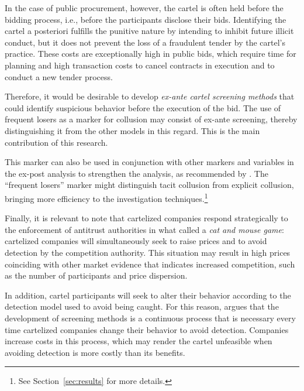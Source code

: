 In the case of public procurement, however, the cartel is often held before the bidding process, i.e., before the participants disclose their bids. Identifying the cartel a posteriori fulfills the punitive nature by intending to inhibit future illicit conduct, but it does not prevent the loss of a fraudulent tender by the cartel's practice. These costs are exceptionally high in public bids, which require time for planning and high transaction costs to cancel contracts in execution and to conduct a new tender process.

Therefore, it would be desirable to develop \textit{ex-ante cartel screening methods} that could identify suspicious behavior before the execution of the bid. The use of frequent losers as a marker for collusion may consist of ex-ante screening, thereby distinguishing it from the other models in this regard. This is the main contribution of this research.

This marker can also be used in conjunction with other markers and variables in the ex-post analysis to strengthen the analysis, as recommended by \citet{harrington2008detecting}. The ``frequent losers'' marker might distinguish tacit collusion from explicit collusion, bringing more efficiency to the investigation techniques.\footnote{See Section~\ref{sec:results} for more details.}

Finally, it is relevant to note that cartelized companies respond strategically to the enforcement of antitrust authorities in what \citet{schinkel2013balancing} called a \textit{cat and mouse game}: cartelized companies will simultaneously seek to raise prices and to avoid detection by the competition authority. This situation may result in high prices coinciding with other market evidence that indicates increased competition, such as the number of participants and price dispersion.

In addition, cartel participants will seek to alter their behavior according to the detection model used to avoid being caught. For this reason, \citet{schinkel2013balancing} argues that the development of screening methods is a continuous process that is necessary every time cartelized companies change their behavior to avoid detection. Companies increase costs in this process, which may render the cartel unfeasible when avoiding detection is more costly than its benefits.

